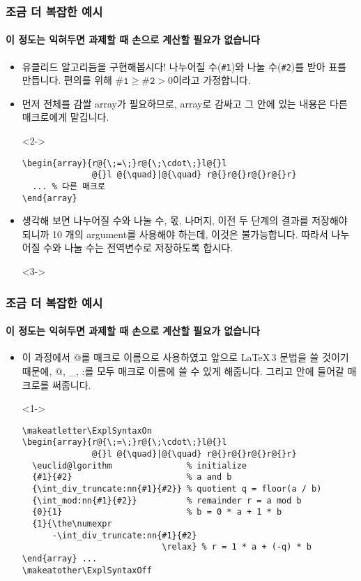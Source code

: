 
\begin{frame}[fragile]
  \frametitle{조금 더 복잡한 예시}
  \framesubtitle{이 정도는 익혀두면 과제할 때 손으로 계산할 필요가 없습니다}
  \begin{itemize}
    \item<1-> 유클리드 알고리듬을 구현해봅시다! 나누어질 수(\texttt{\#1})와 나눌 수(\texttt{\#2})를 받아 표를 만듭니다. 편의를 위해 $\texttt{\#1}\ge\texttt{\#2} > 0$이라고 가정합니다.
    \item<2-> 먼저 전체를 감쌀 array가 필요하므로, array로 감싸고 그 안에 있는 내용은 다른 매크로에게 맡깁니다.
    \item[]<2-> \vspace{-1.5em}\begin{verbatim}
\begin{array}{r@{\;=\;}r@{\;\cdot\;}l@{}l
              @{}l @{\quad}|@{\quad} r@{}r@{}r@{}r@{}r}
  ... % 다른 매크로
\end{array}
    \end{verbatim}
    \item<3-> 생각해 보면 나누어질 수와 나눌 수, 몫, 나머지, 이전 두 단계의 결과를 저장해야 되니까 10 개의 argument를 사용해야 하는데, 이것은 불가능합니다. 따라서 나누어질 수와 나눌 수는 전역변수로 저장하도록 합시다.
    \item[]<3-> \texttt{\gdef\@@@@a{#1}\gdef\@@@@b{#2}}
  \end{itemize}
\end{frame}

\begin{frame}[fragile]
  \frametitle{조금 더 복잡한 예시}
  \framesubtitle{이 정도는 익혀두면 과제할 때 손으로 계산할 필요가 없습니다}
  \begin{itemize}
    \item<1-> 이 과정에서 @를 매크로 이름으로 사용하였고 앞으로 \LaTeX\,3 문법을 쓸 것이기 때문에, @, \_, :를 모두 매크로 이름에 쓸 수 있게 해줍니다. 그리고 안에 들어갈 매크로를 써줍니다.
    \item[]<1-> \vspace{-1.5em}\begin{verbatim}
\makeatletter\ExplSyntaxOn
\begin{array}{r@{\;=\;}r@{\;\cdot\;}l@{}l
              @{}l @{\quad}|@{\quad} r@{}r@{}r@{}r@{}r}
  \euclid@lgorithm               % initialize
  {#1}{#2}                       % a and b
  {\int_div_truncate:nn{#1}{#2}} % quotient q = floor(a / b)
  {\int_mod:nn{#1}{#2}}          % remainder r = a mod b
  {0}{1}                         % b = 0 * a + 1 * b
  {1}{\the\numexpr
      -\int_div_truncate:nn{#1}{#2}
                            \relax} % r = 1 * a + (-q) * b
\end{array} ...
\makeatother\ExplSyntaxOff
    \end{verbatim}
  \end{itemize}
\end{frame}

